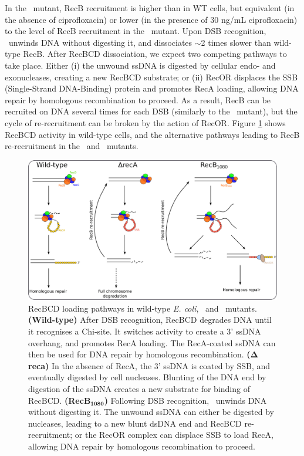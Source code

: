 In the \teneighty\ mutant, RecB recruitment is higher than in WT cells, but equivalent (in the absence of ciprofloxacin) or lower (in the presence of 30 ng/mL ciprofloxacin) to the level of RecB recruitment in the \dreca\ mutant. Upon DSB recognition, \teneighty\ unwinds DNA without digesting it, and dissociates $\sim$2 times slower than wild-type RecB. After RecBCD dissociation, we expect two competing pathways to take place. Either (i) the unwound ssDNA is digested by cellular endo- and exonucleases, creating a new RecBCD substrate; or (ii) RecOR displaces the SSB (Single-Strand DNA-Binding) protein and promotes RecA loading, allowing DNA repair by homologous recombination to proceed. As a result, RecB can be recruited on DNA several times for each DSB (similarly to the \dreca\ mutant), but the cycle of re-recruitment can be broken by the action of RecOR. Figure \ref{Fig:pathways} shows RecBCD activity in wild-type cells, and the alternative pathways leading to RecB re-recruitment in the \dreca\ and \teneighty\ mutants.

\begin{figure}[htbp]
    \centering
    \includegraphics[width=\textwidth]{Figures/Fig_mutants_pathways.pdf}
    \caption{RecBCD loading pathways in wild-type \emph{E. coli}, \dreca\ and \teneighty\ mutants. \textbf{(Wild-type)} After DSB recognition, RecBCD degrades DNA until it recognises a Chi-site. It switches activity to create a 3' ssDNA overhang, and promotes RecA loading. The RecA-coated ssDNA can then be used for DNA repair by homologous recombination. \textbf{($\mathbf{\Delta}$reca)} In the absence of RecA, the 3' ssDNA is coated by SSB, and eventually digested by cell nucleases. Blunting of the DNA end by digestion of the ssDNA creates a new substrate for binding of RecBCD. \textbf{(RecB$\mathbf{_{1080}}$)} Following DSB recognition, \teneighty\ unwinds DNA without digesting it. The unwound ssDNA can either be digested by nucleases, leading to a new blunt dsDNA end and RecBCD re-recruitment; or the RecOR complex can displace SSB to load RecA, allowing DNA repair by homologous recombination to proceed.}
    \label{Fig:pathways}
\end{figure}


